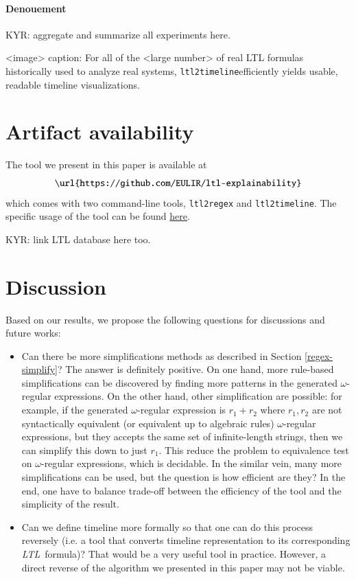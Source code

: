 \documentclass[preprint,12pt]{elsarticle}
\theoremstyle{definition}
\theoremstyle{remark}
\newcommand{\ltl}{\textit{LTL}}
\newcommand{\tool}{\texttt{ltl2timeline}}
\begin{document}
\paragraph{Denouement}
KYR: aggregate and summarize all experiments here.
  
<image>
caption: For all of the <large number> of real LTL formulas historically used to analyze real systems, \tool efficiently yields usable, readable timeline visualizations.



\section{Artifact availability}
The tool we present in this paper is available at
\[
    \texttt{\url{https://github.com/EULIR/ltl-explainability}}
\]
which comes with two command-line tools, \texttt{ltl2regex} and \texttt{ltl2timeline}. The specific usage of the tool can be found  \href{https://github.com/EULIR/ltl-explainability#usage}{here}.

KYR: link LTL database here too.

\section{Discussion}
Based on our results, we propose the following questions for discussions and future works:
\begin{itemize}
    \item Can there be more simplifications methods as described in Section \ref{regex-simplify}? The answer is definitely positive. On one hand, more rule-based simplifications can be discovered by finding more patterns in the generated $\omega$-regular expressions. On the other hand, other simplification are possible: for example, if the generated $\omega$-regular expression is $r_1 + r_2$ where $r_1, r_2$ are not syntactically equivalent (or equivalent up to algebraic rules) $\omega$-regular expressions, but they accepts the same set of infinite-length strings, then we can simplify this down to just $r_1$. This reduce the problem to equivalence test on $\omega$-regular expressions, which is decidable. In the similar vein, many more simplifications can be used, but the question is how efficient are they? In the end, one have to balance trade-off between the efficiency of the tool and the simplicity of the result.
    \item Can we define timeline more formally so that one can do this process reversely (i.e. a tool that converts timeline representation to its corresponding \ltl\ formula)? That would be a very useful tool in practice. However, a direct reverse of the algorithm we presented in this paper may not be viable.
\end{itemize}
\end{document}
